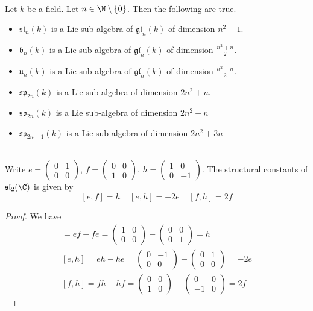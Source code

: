 \documentclass[a4paper]{article}
\begin{document}
\begin{prp}{}{} \\Let $k$ be a field. Let $n\in\N\setminus\{0\}$. Then the following are true. 
\begin{itemize}
\item $\mathfrak{sl}_n(k)$ is a Lie sub-algebra of $\mathfrak{gl}_n(k)$ of dimension $n^2-1$. 
\item $\mathfrak{b}_n(k)$ is a Lie sub-algebra of $\mathfrak{gl}_n(k)$ of dimension $\frac{n^2+n}{2}$. 
\item $\mathfrak{u}_n(k)$ is a Lie sub-algebra of $\mathfrak{gl}_n(k)$ of dimension $\frac{n^2-n}{2}$. 
\item $\mathfrak{sp}_{2n}(k)$ is a Lie sub-algebra of dimension $2n^2+n$. 
\item $\mathfrak{so}_{2n}(k)$ is a Lie sub-algebra of dimension $2n^2+n$
\item $\mathfrak{so}_{2n+1}(k)$ is a Lie sub-algebra of dimension $2n^2+3n$
\end{itemize}
\end{prp}

\begin{eg}{}{} \\Write $e=\begin{pmatrix}
0 & 1\\0 & 0
\end{pmatrix}$, $f=\begin{pmatrix}
0 & 0\\1 & 0
\end{pmatrix}$,  $h=\begin{pmatrix}
1 & 0\\0 & -1
\end{pmatrix}$. The structural constants of $\mathfrak{sl}_2(\C)$ is given by $$[e,f]=h\;\;\;\;[e,h]=-2e\;\;\;\;[f,h]=2f$$

\begin{proof}
We have 
\begin{align*}
[e,f]=ef-fe=\begin{pmatrix}
1 & 0\\0 & 0
\end{pmatrix}-\begin{pmatrix}
0 & 0\\0 & 1
\end{pmatrix}=h\\
[e,h]=eh-he=\begin{pmatrix}
0 & -1\\0 & 0
\end{pmatrix}-\begin{pmatrix}
0 & 1\\0 & 0
\end{pmatrix}=-2e\\
[f,h]=fh-hf=\begin{pmatrix}
0 & 0\\1 & 0
\end{pmatrix}-\begin{pmatrix}
0 & 0\\-1 & 0
\end{pmatrix}=2f
\end{align*}
\end{proof}
\end{eg}
\end{document}
